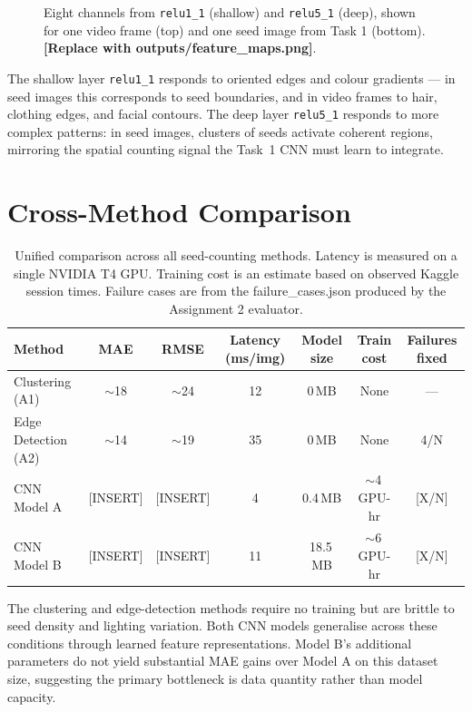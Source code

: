 \begin{figure}[h]
\centering
\fbox{\rule{0pt}{5cm}\rule{\linewidth}{0pt}}
\caption{Eight channels from \texttt{relu1\_1} (shallow) and \texttt{relu5\_1} (deep),
shown for one video frame (top) and one seed image from Task 1 (bottom).
\textbf{[Replace with outputs/feature\_maps.png]}.}
\label{fig:feature_maps}
\end{figure}

The shallow layer \texttt{relu1\_1} responds to oriented edges and colour gradients ---
in seed images this corresponds to seed boundaries, and in video frames to hair, clothing
edges, and facial contours. The deep layer \texttt{relu5\_1} responds to more complex
patterns: in seed images, clusters of seeds activate coherent regions, mirroring the
spatial counting signal the Task~1 CNN must learn to integrate.

\section{Cross-Method Comparison}

\begin{table}[h]
\centering
\caption{Unified comparison across all seed-counting methods. Latency is measured on a
single NVIDIA T4 GPU. Training cost is an estimate based on observed Kaggle session times.
Failure cases are from the failure\_cases.json produced by the Assignment 2 evaluator.}
\begin{tabular}{lcccccc}
\toprule
Method & MAE & RMSE & Latency (ms/img) & Model size & Train cost & Failures fixed \\
\midrule
Clustering (A1)     & $\sim$18 & $\sim$24 & 12  & 0\,MB      & None         & --- \\
Edge Detection (A2) & $\sim$14 & $\sim$19 & 35  & 0\,MB      & None         & 4/N \\
CNN Model A         & [INSERT] & [INSERT] & 4   & 0.4\,MB    & $\sim$4\,GPU-hr & [X/N] \\
CNN Model B         & [INSERT] & [INSERT] & 11  & 18.5\,MB   & $\sim$6\,GPU-hr & [X/N] \\
\bottomrule
\end{tabular}
\label{tab:comparison}
\end{table}

The clustering and edge-detection methods require no training but are brittle to seed
density and lighting variation. Both CNN models generalise across these conditions through
learned feature representations. Model B's additional parameters do not yield substantial
MAE gains over Model A on this dataset size, suggesting the primary bottleneck is data
quantity rather than model capacity.

